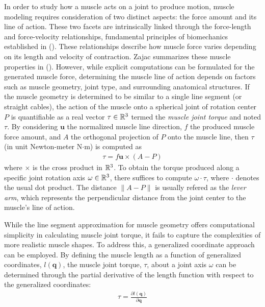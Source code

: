 In order to study how a muscle acts on a joint to produce motion, muscle modeling requires consideration of two distinct aspects: the force amount and its line of action. These two facets are intrinsically linked through the force-length and force-velocity relationships, fundamental principles of biomechanics established in (\cite{hillHeatShorteningDynamic1938}). These relationships describe how muscle force varies depending on its length and velocity of contraction. Zajac summarizes these muscle properties in (\cite{zajacMuscleTendonProperties1989a}). However, while explicit computations can be formulated for the generated muscle force, determining the muscle line of action depends on factors such as muscle geometry, joint type, and surrounding anatomical structures. If the muscle geometry is determined to be similar to a single line segment (or straight cables), the action of the muscle onto a spherical joint of rotation center $P$ is quantifiable as a real vector $\tau\in \mathbb{R}^3$ termed the \emph{muscle joint torque} and noted $\tau$. By considering $\mathbf{u}$ the normalized muscle line direction, $f$ the produced muscle force amount, and $A$ the orthogonal projection of $P$ onto the muscle line, then $\tau$ (in unit Newton-meter N$\cdot$m) is computed as 
\begin{align*}
    \tau = f\mathbf{u} \times (A - P)
\end{align*} 
where $\times$ is the cross product in $\mathbb{R}^3$. To obtain the torque produced along a specific joint rotation axis $\omega\in \mathbb{R}^3$, there suffices to compute $\omega \cdot \tau$, where $\cdot$ denotes the usual dot product. The distance $\| A - P \|$ is usually refered as the \emph{lever arm}, which represents the perpendicular distance from the joint center to the muscle's line of action.

While the line segment approximation for muscle geometry offers computational simplicity in calculating muscle joint torque, it fails to capture the complexities of more realistic muscle shapes.  To address this, a generalized coordinate approach can be employed. By defining the muscle length as a function of generalized coordinates, $l(\mathbf{q})$, the muscle joint torque, $\tau$, about a joint axis $\omega$ can be determined through the partial derivative of the length function with respect to the generalized coordinates:
\begin{align*}
    \tau = \frac{\partial l(\mathbf{q})}{\partial \mathbf{q}}
\end{align*}

